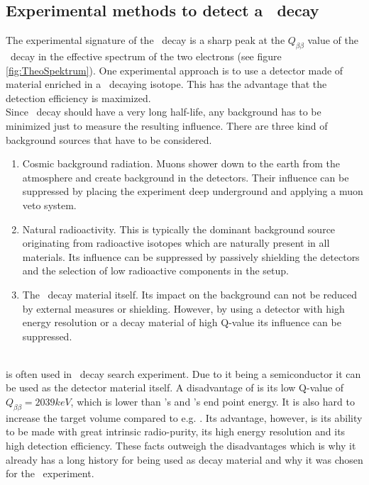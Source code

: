 \documentclass[encoding=utf8,british]{tumphthesis}
\begin{document}
\subsection{Experimental methods to detect a \onbb\ decay}

The experimental signature of the \onbb\ decay is a sharp peak at the $Q_{\beta\beta}$ value of the \twonu\ decay in the effective spectrum of the two electrons (see figure \ref{fig:TheoSpektrum}).
One experimental approach is to use a detector made of material enriched in a \onbb\ decaying isotope.
This has the advantage that the detection efficiency is maximized.
\\

Since \onbb\ decay should have a very long half-life, any background has to be minimized just to measure the resulting influence.
There are three kind of background sources that have to be considered.
\begin{enumerate}
    \item Cosmic background radiation.
Muons shower down to the earth from the atmosphere and create background in the detectors.
Their influence can be suppressed by placing the experiment deep underground and applying a muon veto system.
\item Natural radioactivity.
This is typically the dominant background source originating from radioactive isotopes which are naturally present in all materials.
Its influence can be suppressed by passively shielding the detectors and the selection of low radioactive components in the setup. 
\item The \twonu\ decay material itself.
Its impact on the background can not be reduced by external measures or shielding.
However, by using a detector with high energy resolution or a decay material of high Q-value its influence can be suppressed.
\end{enumerate}
\\

 is often used in \onbb\ decay search experiment. 
Due to it being a semiconductor it can be used as the detector material itself.
A disadvantage of  is its low Q-value of $Q_{\beta\beta} = 2039\unit{keV}$, which is lower than 's and 's end point energy.
It is also hard to increase the target volume compared to e.g. .
Its advantage, however, is its ability to be made with great intrinsic radio-purity, its high energy resolution and its high detection efficiency.
These facts outweigh the disadvantages which is why it already has a long history for being used as decay material and why it was chosen for the \gerda\ experiment.
\\
\end{document}
